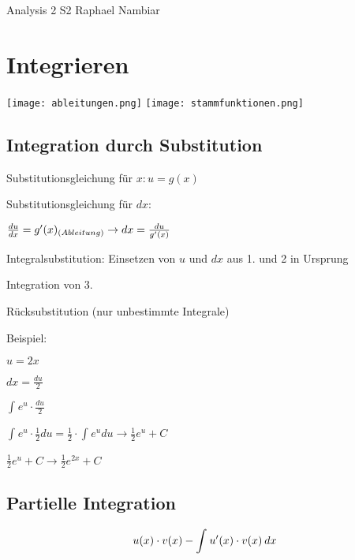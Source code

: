 



\begin{multicols*}{3}

\DocumentInfo
{Analysis 2 S2} %
{Raphael Nambiar} %

\WhiteSpace

\section{Integrieren}

 \texttt{[image: ableitungen.png]} 
  \texttt{[image: stammfunktionen.png]} 

\subsection{Integration durch Substitution}
{ Substitutionsgleichung für $x: u = g(x)$}

{ Substitutionsgleichung für $dx:$}

$ \frac{du}{dx} = g'(x)_{\tiny(Ableitung)} \to dx = \frac{du}{g'(x)}$

{ Integralsubstitution: Einsetzen von $ u $ und $ dx $ aus 1. und 2 in Ursprung}

{ Integration von 3.}

{ Rücksubstitution (nur unbestimmte Integrale)}


\begin{multicols}{2}
{Beispiel:}

 
\columnbreak

{ $ u = 2x $}
  
{ $ dx = \frac{du}{2} $}  

{ $ \int_{}{}e^u \cdot  \frac{du}{2} $}

\end{multicols}
\vspace{-10pt}
 { $ \int_{}{}e^u \cdot  \frac{1}{2}du = \frac{1}{2} \cdot  \int_{}{}e^u du \rightarrow \frac{1}{2} e^u + C   $}


{ $\frac{1}{2} e^u + C \rightarrow \frac{1}{2} e^{2x} + C$ }



\subsection{Partielle Integration}
{\large $$u(x)\cdot v(x) - \int_{}^{}u'(x) \cdot v(x) \hspace{2px}  dx$$}


\end{multicols*}
